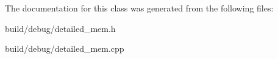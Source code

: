 The documentation for this class was generated from the following files\-:\begin{DoxyCompactItemize}
\item 
build/debug/detailed\-\_\-mem.\-h\item 
build/debug/detailed\-\_\-mem.\-cpp\end{DoxyCompactItemize}
